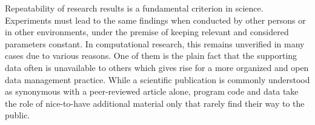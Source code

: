 \documentclass{acm_proc_article-sp}
\begin{document}
Repeatability of research results is a fundamental criterion in science. %
Experiments must lead to the same findings when conducted by other persons or in other environments, under the premise of keeping relevant and considered parameters constant.
In computational research, this remains unverified in many cases due to various reasons.
\cite{peng2011reproducible}
One of them is the plain fact that the supporting data often is unavailable to others which gives rise for a more organized and open data management practice. \cite{Wood1298248}
While a scientific publication is commonly understood as synonymous with a peer-reviewed article alone, program code and data take the role of nice-to-have additional material only that rarely find their way to the public.
\end{document}
